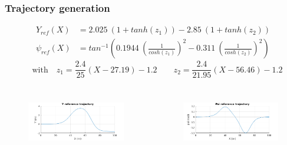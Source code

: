 \documentclass{beamer}
\begin{document}
\begin{frame}
\frametitle{Trajectory generation}

\begin{align*}
Y_{ref}(X) &= 2.025 \ (1 + tanh(z_1)) - 2.85 \ (1 + tanh(z_2)) \\
\psi_{ref}(X) &= tan^{-1} \left( 0.1944 \ \left(\frac{1}{cosh(z_1)}\right)^2 - 0.311 \ \left(\frac{1}{cosh(z_2)}\right)^2 \right)
\end{align*}
\[\quad \text{with} \quad z_1 = \frac{2.4}{25}(X - 27.19) - 1.2 \qquad z_2 =
\frac{2.4}{21.95}(X - 56.46) - 1.2 \]


\begin{columns}[t,onlytextwidth]
\begin{figure} [h]
\begin{center}
\includegraphics[scale=0.37]{images/Yref_graph.png}
\label{fig:y_reference}
\end{center}
\end{figure}

\begin{figure} [h]
\begin{center}
\includegraphics[scale=0.37]{images/Psiref_graph.png}
\label{fig:psi_reference}
\end{center}
\end{figure}

\end{columns}

\end{frame}
\end{document}
